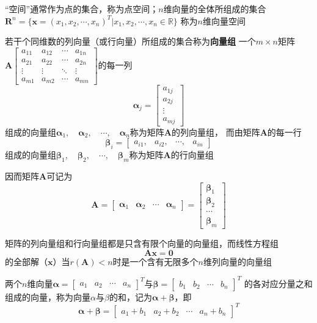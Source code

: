 \documentclass[UTF8]{ctexart}
\newcommand{\ve}[1]{{\bm{#1}}}
\newcommand{\mat}[1]{\ve{#1}}
\newcommand{\emplin}{\vspace{1em}}
\begin{document}
“空间”通常作为点的集合，称为点空间；$n$维向量的全体所组成的集合$\mat{R}^n=\{ \mat{x}=(x_1,x_2,\cdots,x_n)^T|x_1,x_2,\cdots,x_n\in\mathbb{R} \}$
称为$n$维向量空间

\emplin

若干个同维数的列向量（或行向量）所组成的集合称为\textbf{向量组}
一个$m\times n$矩阵$\displaystyle\mat{A}
\begin{bmatrix}
a_{11}&a_{12}&\cdots&a_{1n}\\
a_{21}&a_{22}&\cdots&a_{2n}\\
\vdots&\vdots&\ddots&\vdots\\
a_{m1}&a_{m2}&\cdots&a_{mn}
\end{bmatrix}$的每一列
\[\mat{\alpha}_j=
\begin{bmatrix}
  a_{1j}\\
  a_{2j}\\
  \vdots\\
  a_{mj}
\end{bmatrix}\]组成的向量组$\mat{\alpha}_1,\quad\mat{\alpha}_2,\quad\cdots,\quad\mat{\alpha}_n$称为矩阵$\mat{A}$的列向量组，
而由矩阵$\mat{A}$的每一行
\[\mat{\beta}_i=
\begin{bmatrix}
  a_{i1},&a_{i2},&\cdots,&a_{in}
\end{bmatrix}\]组成的向量组$\mat{\beta}_1,\quad\mat{\beta}_2,\quad\cdots,\quad\mat{\beta}_m$称为矩阵$\mat{A}$的行向量组

因而矩阵$\mat{A}$可记为
\[\mat{A}=\begin{bmatrix}
  \mat{\alpha}_1&\mat{\alpha}_2&\cdots&\mat{\alpha}_n
\end{bmatrix}=\begin{bmatrix}
  \mat{\beta}_1\\\mat{\beta}_2\\\cdots\\\mat{\beta}_m
\end{bmatrix}\]

\emplin

矩阵的列向量组和行向量组都是只含有限个向量的向量组，而线性方程组
\[\mat{A}\mat{x}=\mat{0}\]
的全部解（$\mat{x}$）当$r(\mat{A})<n$时是一个含有无限多个$n$维列向量的向量组

\emplin

两个$n$维向量$\mat{\alpha}=\begin{bmatrix}a_1&a_2&\cdots&a_n\end{bmatrix}^T$与$\mat{\beta}=\begin{bmatrix}b_1&b_2&\cdots&b_n\end{bmatrix}^T$
的各对应分量之和组成的向量，称为向量$\alpha$与$\beta$的和，记为$\mat{\alpha}+\mat{\beta}$，即
\[\mat{\alpha}+\mat{\beta}=\begin{bmatrix}a_1+b_1&a_2+b_2&\cdots&a_n+b_n\end{bmatrix}^T\]
\end{document}
